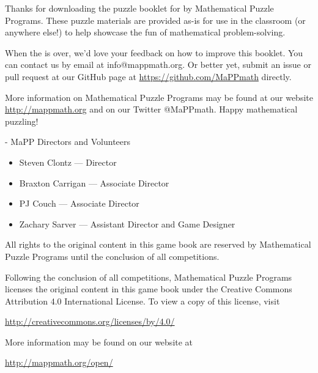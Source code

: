 
Thanks for downloading the puzzle booklet for \textbf{\phEventName} by
Mathematical Puzzle Programs.  These puzzle materials are provided as-is for use
in the classroom (or anywhere else!)  to help showcase the fun of mathematical
problem-solving.

When the \phEventName is over, we'd love your feedback on how to improve this
booklet. You can contact us by email at info@mappmath.org. Or better yet, submit
an issue or pull request at our GitHub page at \url{https://github.com/MaPPmath}
directly.

More information on Mathematical Puzzle Programs may be found at our website
\url{http://mappmath.org} and on our Twitter @MaPPmath. Happy mathematical puzzling!

- MaPP Directors and Volunteers

  \begin{itemize}
    \item Steven Clontz --- Director
    \item Braxton Carrigan --- Associate Director
    \item PJ Couch --- Associate Director
    \item Zachary Sarver --- Assistant Director and \phEventAbbr Game Designer
  \end{itemize}


All rights to the original content in this game book are reserved by
Mathematical Puzzle Programs until the conclusion
of all \phEventName competitions.

Following the conclusion of all \phEventName competitions,
Mathematical Puzzle Programs licenses the original content in this game book
under the Creative Commons Attribution 4.0
International License. To view a copy of this license, visit

\begin{center}
  \url{http://creativecommons.org/licenses/by/4.0/}
\end{center}

More information may be found on our website at

\begin{center}
  \url{http://mappmath.org/open/}
\end{center}

